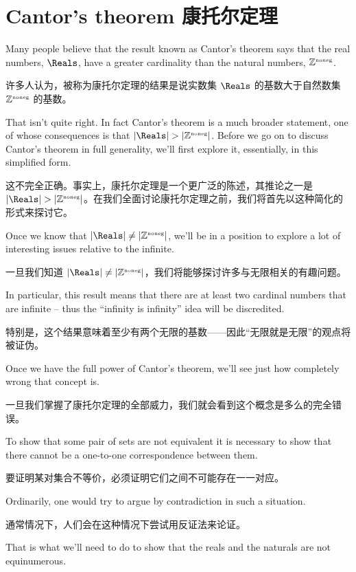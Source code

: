 \newpage

\section{Cantor's theorem 康托尔定理}
\label{sec:cantors_thm}

Many people believe that the result known as Cantor's theorem says that
the real numbers, $\Reals$, have a greater cardinality than the natural numbers, ${\mathbb Z}^{\mbox{\tiny noneg}}$.

许多人认为，被称为康托尔定理的结果是说实数集 $\Reals$ 的基数大于自然数集 ${\mathbb Z}^{\mbox{\tiny noneg}}$ 的基数。

That isn't quite right.  In fact Cantor's theorem is a much broader statement,
one of whose consequences is that $|\Reals|
    > |\Naturals|$.  Before we go
on to discuss Cantor's theorem in full generality, we'll first explore it,
essentially, in this simplified form.

这不完全正确。事实上，康托尔定理是一个更广泛的陈述，其推论之一是 $|\Reals| > |\Naturals|$。在我们全面讨论康托尔定理之前，我们将首先以这种简化的形式来探讨它。

Once we know that $|\Reals| \neq |\Naturals|$, we'll be in a position to
explore a lot of
interesting issues relative to the infinite.

一旦我们知道 $|\Reals| \neq |\Naturals|$，我们将能够探讨许多与无限相关的有趣问题。

In particular, this result
means that there are at least two cardinal numbers that are
infinite -- thus the ``infinity is infinity'' idea will be discredited.

特别是，这个结果意味着至少有两个无限的基数——因此“无限就是无限”的观点将被证伪。

Once we have the full power of Cantor's
theorem, we'll see just how completely wrong that concept is.

一旦我们掌握了康托尔定理的全部威力，我们就会看到这个概念是多么的完全错误。

To show that some pair of sets are not equivalent it is necessary to show
that there cannot be a one-to-one correspondence between them.

要证明某对集合不等价，必须证明它们之间不可能存在一一对应。

Ordinarily,
one would try to argue by contradiction in such a situation.

通常情况下，人们会在这种情况下尝试用反证法来论证。

That is what
we'll need to do to show that the reals and the naturals are not equinumerous.

